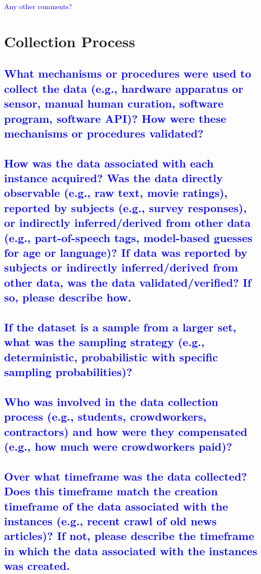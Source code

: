 \documentclass[letterpaper, 10 pt, conference]{ieeeconf}  %
\begin{document}
\textcolor{blue}{Any other comments?}
\lipsum[1]

\section{Collection Process}

\textcolor{blue}{\subsection{What mechanisms or procedures were used to collect the data (e.g.,
hardware apparatus or sensor, manual human curation, software program, software API)? How were these mechanisms or procedures validated?}}
\lipsum[1]

\textcolor{blue}{\subsection{How was the data associated with each instance acquired? Was the
data directly observable (e.g., raw text, movie ratings), reported by subjects (e.g., survey responses), or indirectly inferred/derived from other data
(e.g., part-of-speech tags, model-based guesses for age or language)?
If data was reported by subjects or indirectly inferred/derived from other
data, was the data validated/verified? If so, please describe how.}}
\lipsum[1]

\textcolor{blue}{\subsection{If the dataset is a sample from a larger set, what was the sampling strategy (e.g., deterministic, probabilistic with specific sampling probabilities)?}}
\lipsum[1]

\textcolor{blue}{\subsection{Who was involved in the data collection process (e.g., students,
crowdworkers, contractors) and how were they compensated (e.g.,
how much were crowdworkers paid)?}}
\lipsum[1]

\textcolor{blue}{\subsection{Over what timeframe was the data collected? Does this timeframe
match the creation timeframe of the data associated with the instances
(e.g., recent crawl of old news articles)? If not, please describe the timeframe in which the data associated with the instances was created.}}
\lipsum[1]
\end{document}
